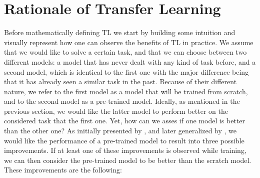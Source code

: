 \section{Rationale of Transfer Learning}
\label{sec:rationale}

Before mathematically defining TL we start by building some intuition and visually represent how one can observe the benefits of TL in practice. We assume that we would like to solve a certain task, and that we can choose between two different models: a model that has never dealt with any kind of task before, and a second model, which is identical to the first one with the major difference being that it has already seen a similar task in the past. Because of their different nature, we refer to the first model as a model that will be trained from scratch, and to the second model as a pre-trained model. Ideally, as mentioned in the previous section, we would like the latter model to perform better on the considered task that the first one. Yet, how can we asses if one model is better than the other one? As initially presented by \citet{langley2006transfer}, and later generalized by \citet{lazaric2012transfer}, we would like the performance of a pre-trained model to result into three possible improvements. If at least one of these improvements is observed while training, we can then consider the pre-trained model to be better than the scratch model. These improvements are the following:
